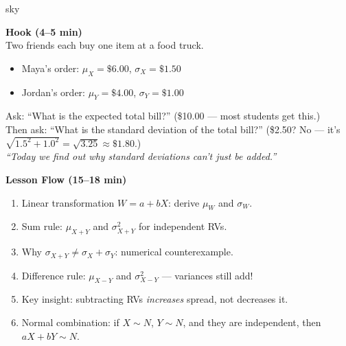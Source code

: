 \documentclass[10pt]{article}
\begin{document}
\begin{skillbox}[Hook]{sky}
\begin{minipage}[t]{0.48\linewidth}
    \textbf{Hook (4--5 min)}\\
    Two friends each buy one item at a food truck.
    \begin{itemize}
        \item Maya's order: $\mu_X = \$6.00$, $\sigma_X = \$1.50$
        \item Jordan's order: $\mu_Y = \$4.00$, $\sigma_Y = \$1.00$
    \end{itemize}
    Ask: ``What is the expected total bill?'' (\$10.00 --- most students get this.)\\
    Then ask: ``What is the standard deviation of the total bill?'' (\$2.50?
    No --- it's $\sqrt{1.5^2 + 1.0^2} = \sqrt{3.25} \approx \$1.80$.)\\[4pt]
    \textit{``Today we find out why standard deviations can't just be added.''}
\end{minipage}
\hfill
\begin{minipage}[t]{0.48\linewidth}
    \textbf{Lesson Flow (15--18 min)}
    \begin{enumerate}
        \item Linear transformation $W = a + bX$: derive $\mu_W$ and $\sigma_W$.
        \item Sum rule: $\mu_{X+Y}$ and $\sigma^2_{X+Y}$ for independent RVs.
        \item Why $\sigma_{X+Y} \ne \sigma_X + \sigma_Y$: numerical counterexample.
        \item Difference rule: $\mu_{X-Y}$ and $\sigma^2_{X-Y}$ --- variances still add!
        \item Key insight: subtracting RVs \emph{increases} spread, not decreases it.
        \item Normal combination: if $X \sim N$, $Y \sim N$, and they are independent,
              then $aX + bY \sim N$.
    \end{enumerate}
\end{minipage}
\end{skillbox}
\end{document}
